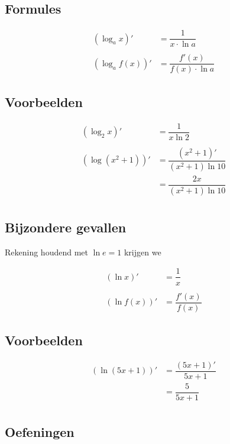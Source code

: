 \documentclass[12pt]{article}
\begin{document}
\begin{theorie}

\subsection{Formules}

\begin{align*}
  (\log_a x)' &= \dfrac{1}{x\cdot \ln a}\\\\
  (\log_a f(x))' &= \dfrac{f'(x)}{f(x)\cdot \ln a} 
\end{align*}

\subsection{Voorbeelden}

\begin{align*}
\left(\log_2 x\right)' &= \dfrac{1}{x\ln 2}\\\\
\left(\log(x^2+1)\right)' &= \dfrac{(x^2+1)'}{(x^2+1)\ln 10}\\
                           &= \dfrac{2x}{(x^2+1)\ln 10}\\
\end{align*}

\subsection{Bijzondere gevallen}

Rekening houdend met $\ln e = 1$ krijgen we

\begin{align*}
  (\ln x)' &= \dfrac{1}{x}\\\\
  (\ln f(x))' &= \dfrac{f'(x)}{f(x)} 
\end{align*}

\subsection{Voorbeelden}

\begin{align*}
\left(\ln(5x+1)\right)' &= \dfrac{(5x+1)'}{5x+1}\\
                        &= \dfrac{5}{5x+1}\\
\end{align*}

\subsection{Oefeningen}

\end{theorie}
\end{document}
